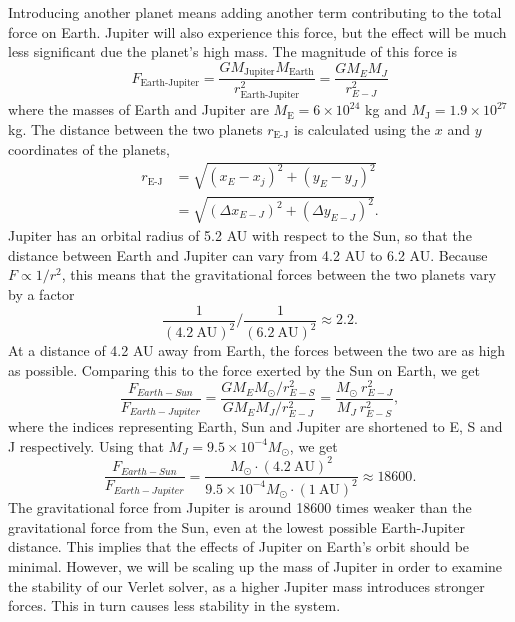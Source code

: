 \documentclass{emulateapj}
\begin{document}
Introducing another planet means adding another term contributing to the total force on Earth. Jupiter will also experience this force, but the effect will be much less significant due the planet's high mass. The magnitude of this force is
%
\begin{equation*}
    F_{\textrm{Earth-Jupiter}} = \frac{GM_{\textrm{Jupiter}} M_{\textrm{Earth}}}{r_{\textrm{Earth-Jupiter}}^2} = \frac{GM_E M_J}{r_{E-J}^2}
\end{equation*}
%
where the masses of Earth and Jupiter are $M_{\textrm{E}} = 6 \times 10^{24}$ kg and $M_{\textrm{J}} = 1.9 \times 10^{27}$ kg. The distance between the two planets $r_{\textrm{E-J}}$ is calculated using the $x$ and $y$ coordinates of the planets,
%
\begin{align*}
    r_{\textrm{E-J}} &= \sqrt{\left(x_E - x_j\right)^2 + \left(y_E - y_J\right)^2 } \\
    &= \sqrt{(\Delta x_{E-J})^2 + (\Delta y_{E-J})^2}.
\end{align*}
%
Jupiter has an orbital radius of 5.2 AU with respect to the Sun, so that the distance between Earth and Jupiter can vary from 4.2 AU to 6.2 AU. Because $F \propto 1/r^2$, this means that the gravitational forces between the two planets vary by a factor
%
\begin{equation*}
    \frac{1}{(4.2 \ \textrm{AU})^2} \bigg/  \frac{1}{(6.2 \ \textrm{AU})^2} \approx 2.2.
\end{equation*}
%
At a distance of 4.2 AU away from Earth, the forces between the two are as high as possible. Comparing this to the force exerted by the Sun on Earth, we get
%
\begin{equation*}
    \frac{F_{Earth-Sun}}{F_{Earth-Jupiter}} = \frac{G M_E M_{\odot}/r_{E-S}^2}{G M_E M_J/r_{E-J}^2} = \frac{M_{\odot} \ r_{E-J}^2}{M_J \ r_{E-S}^2},
\end{equation*}
%
where the indices representing Earth, Sun and Jupiter are shortened to E, S and J respectively.
Using that $M_{J} = 9.5 \times 10^{-4} M_\odot$, we get
%
\begin{equation*}
    \frac{F_{Earth-Sun}}{F_{Earth-Jupiter}} = \frac{M_\odot \cdot (4.2 \ \textrm{AU})^2}{9.5 \times 10^{-4} M_\odot \cdot (1 \ \textrm{AU})^2} \approx 18600.
\end{equation*}
%
The gravitational force from Jupiter is around 18600 times weaker than the gravitational force from the Sun, even at the lowest possible Earth-Jupiter distance. This implies that the effects of Jupiter on Earth's orbit should be minimal. However, we will be scaling up the mass of Jupiter in order to examine the stability of our Verlet solver, as a higher Jupiter mass introduces stronger forces. This in turn causes less stability in the system.
\end{document}
